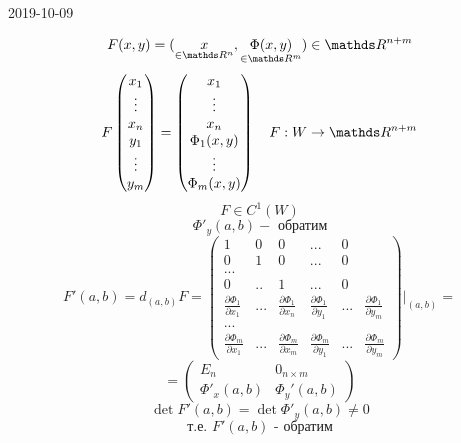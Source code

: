 \documentclass[main]{subfiles}
\begin{document}
\begin{lect} {2019-10-09}
	\begin{Proof}
		\[F(x, y) = (\us{\in \R^n}{x}, \us{\in \R^m}{\Phi(x,y)}) \in \R^{n + m}\]
		\[F \begin{pmatrix}
				x_1    \\
				\vdots \\
				x_n    \\
				y_1    \\
				\vdots \\
				y_m
			\end{pmatrix} =
			\begin{pmatrix}
				x_1         \\
				\vdots      \\
				x_n         \\
				\Phi_1(x,y) \\
				\vdots      \\
				\Phi_m(x, y)
			\end{pmatrix}
			\q F : W \to \R^{n + m} \]
		\[F \in C^{1}(W) \]
		\[\Phi'_y(a, b) - \text{ обратим}\]
		\[F'(a, b) = d_{(a, b)} F =
			\begin{pmatrix}
				1                                    & 0   & 0                                    & ... & 0 \\
				0                                    & 1   & 0                                    & ... & 0 \\
				...                                                                                         \\
				0                                    & ..  & 1                                    & ... & 0 \\
				\frac{\partial \Phi_1}{\partial x_1} & ... & \frac{\partial \Phi_1}{\partial x_n} &
				\frac{\partial \Phi_1}{\partial y_1} & ... & \frac{\partial \Phi_1}{\partial y_m}           \\
				...                                                                                         \\
				\frac{\partial \Phi_m}{\partial x_1} & ... & \frac{\partial \Phi_m}{\partial x_m} &
				\frac{\partial \Phi_m}{\partial y_1} & ... & \frac{\partial \Phi_m}{\partial y_m}
			\end{pmatrix} \Bigg|_{(a, b)} = \]
		\[= \begin{pmatrix}
				E_n           & 0_{n \times m} \\
				\Phi'_x(a, b) & \Phi_y'(a, b)
			\end{pmatrix}\]
		\[\det F'(a, b) = \det \Phi'_y(a, b) \neq 0\]
		\[\text{т.е. } F'(a, b) \text{ - обратим} \]

\end{Proof}
\end{lect}
\end{document}
